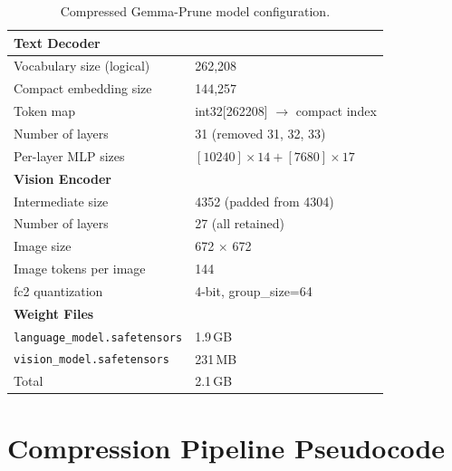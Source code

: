\documentclass[11pt]{article}
\begin{document}
\begin{table}[h]
\centering
\caption{Compressed Gemma-Prune model configuration.}
\label{tab:compressed_config}
\begin{tabular}{@{}ll@{}}
\toprule
\textbf{Text Decoder} & \\
\midrule
Vocabulary size (logical) & 262,208 \\
Compact embedding size & 144,257 \\
Token map & int32[262208] $\rightarrow$ compact index \\
Number of layers & 31 (removed 31, 32, 33) \\
Per-layer MLP sizes & $[10240] \times 14 + [7680] \times 17$ \\
\midrule
\textbf{Vision Encoder} & \\
\midrule
Intermediate size & 4352 (padded from 4304) \\
Number of layers & 27 (all retained) \\
Image size & 672 $\times$ 672 \\
Image tokens per image & 144 \\
fc2 quantization & 4-bit, group\_size=64 \\
\midrule
\textbf{Weight Files} & \\
\midrule
\texttt{language\_model.safetensors} & 1.9\,GB \\
\texttt{vision\_model.safetensors} & 231\,MB \\
Total & 2.1\,GB \\
\bottomrule
\end{tabular}
\end{table}

\section{Compression Pipeline Pseudocode}
\label{app:pseudocode}
\end{document}
